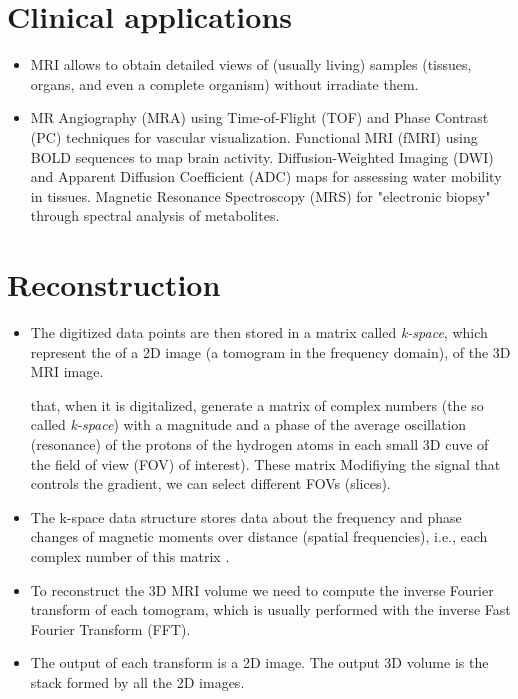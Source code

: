 \section{Clinical applications}
\begin{itemize}
\item \gls{MRI}
  \cite{westbrook2018mri,Wu2022MRI_Physics,thePIRL2018NMR_basics,thePIRL2018SpinEcho,thePIRL2018Fourier,thePIRL2018GRE}
  allows to obtain detailed views of (usually living) samples
  (tissues, organs, and even a complete organism) without irradiate
  them.
\item MR Angiography (MRA) using Time-of-Flight (TOF) and Phase Contrast (PC) techniques for vascular visualization. Functional MRI (fMRI) using BOLD sequences to map brain activity. Diffusion-Weighted Imaging (DWI) and Apparent Diffusion Coefficient (ADC) maps for assessing water mobility in tissues. Magnetic Resonance Spectroscopy (MRS) for "electronic biopsy" through spectral analysis of metabolites.
\end{itemize}

\section{Reconstruction}
\begin{itemize}
\item The digitized data points are then stored in a matrix called
  \emph{k-space}, which represent the  of a 2D image (a
  tomogram in the frequency domain), of the 3D MRI image.

   that, when it is digitalized, generate a matrix of
complex numbers (the so called \emph{k-space}) with a magnitude and a
phase of the average oscillation (resonance) of the protons of the
hydrogen atoms in each small 3D cuve of the field of view (FOV) of
interest). These matrix  Modifiying the signal that
controls the gradient, we can select different FOVs (slices).
\item The k-space data structure stores data about the frequency and
  phase changes of magnetic moments over distance (spatial
  frequencies), i.e., each complex number of this matrix
  .
\item To reconstruct the 3D MRI volume we need to compute the inverse
  Fourier transform of each tomogram, which is usually performed with the
  inverse Fast Fourier Transform (FFT).
\item The output of each transform is
  a 2D image. The output 3D volume is the stack formed by all the 2D
  images.
\end{itemize}


